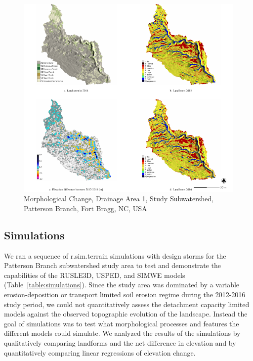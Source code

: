 \documentclass[gmd, manuscript]{copernicus}
\begin{document}
\begin{figure}
\center
\includegraphics[width=\textwidth,height=0.95\textheight,keepaspectratio]{figures/study_area.pdf}
\caption{Morphological Change, Drainage Area 1, Study Subwatershed, Patterson Branch, Fort Bragg, NC, USA}
\label{fig:study_area}
\end{figure}

\subsection{Simulations}
%
We ran a sequence of r.sim.terrain simulations 
with design storms
for the Patterson Branch subwatershed study area
to test and demonstrate the capabilities 
of the RUSLE3D, USPED, and SIMWE models
(Table~\ref{table:simulations}).
%
Since the study area was dominated by
a variable erosion-deposition or transport limited
soil erosion regime during the 2012-2016 study period, 
we could not quantitatively assess 
the detachment capacity limited models
against the observed topographic evolution of the landscape.
%
Instead the goal of simulations was to test
what morphological processes and features 
the different models could simulate. 
%
We analyzed the results of the simulations 
by qualitatively comparing landforms 
and the net difference in elevation
and by quantitatively comparing 
linear regressions of elevation change.
\end{document}
